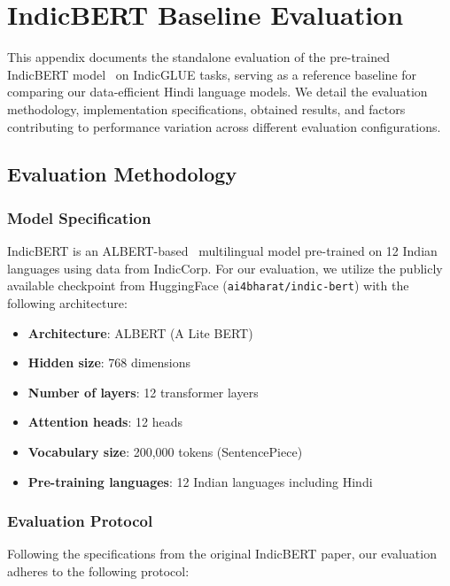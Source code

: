 \chapter{IndicBERT Baseline Evaluation}
\label{app:indicbert-evaluation}

This appendix documents the standalone evaluation of the pre-trained IndicBERT model~\cite{kakwani2020indicnlpsuite} on IndicGLUE tasks, serving as a reference baseline for comparing our data-efficient Hindi language models. We detail the evaluation methodology, implementation specifications, obtained results, and factors contributing to performance variation across different evaluation configurations.

\section{Evaluation Methodology}
\label{sec:indicbert-methodology}

\subsection{Model Specification}

IndicBERT is an ALBERT-based~\cite{lan2019albert} multilingual model pre-trained on 12 Indian languages using data from IndicCorp. For our evaluation, we utilize the publicly available checkpoint from HuggingFace (\texttt{ai4bharat/indic-bert}) with the following architecture:

\begin{itemize}
    \item \textbf{Architecture}: ALBERT (A Lite BERT)
    \item \textbf{Hidden size}: 768 dimensions
    \item \textbf{Number of layers}: 12 transformer layers
    \item \textbf{Attention heads}: 12 heads
    \item \textbf{Vocabulary size}: 200,000 tokens (SentencePiece)
    \item \textbf{Pre-training languages}: 12 Indian languages including Hindi
\end{itemize}

\subsection{Evaluation Protocol}

Following the specifications from the original IndicBERT paper, our evaluation adheres to the following protocol:

